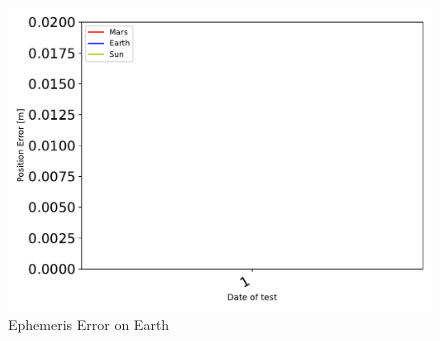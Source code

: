 \begin{figure}[htbp]\centerline{\includegraphics[height=0.7\textwidth, keepaspectratio]{AutoTeX/EphemEarth}}\caption{Ephemeris Error on Earth}\label{fig:EphemEarth}\end{figure}